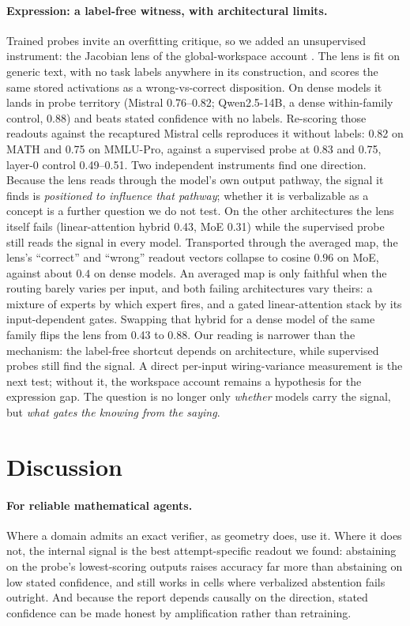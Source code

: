 \documentclass{article}
\begin{document}
\paragraph{Expression: a label-free witness, with architectural limits.}
Trained probes invite an overfitting critique, so we added an unsupervised instrument: the Jacobian lens of the global-workspace account \citep{gurnee2026workspace}.
The lens is fit on generic text, with no task labels anywhere in its construction, and scores the same stored activations as a wrong-vs-correct disposition.
On dense models it lands in probe territory (Mistral 0.76--0.82; Qwen2.5-14B, a dense within-family control, 0.88) and beats stated confidence with no labels.
Re-scoring those readouts against the recaptured Mistral cells reproduces it without labels: 0.82 on MATH and 0.75 on MMLU-Pro, against a supervised probe at 0.83 and 0.75, layer-0 control 0.49--0.51.
Two independent instruments find one direction.
Because the lens reads through the model's own output pathway, the signal it finds is \emph{positioned to influence that pathway}; whether it is verbalizable as a concept is a further question we do not test.
On the other architectures the lens itself fails (linear-attention hybrid 0.43, MoE 0.31) while the supervised probe still reads the signal in every model.
Transported through the averaged map, the lens's ``correct'' and ``wrong'' readout vectors collapse to cosine $0.96$ on MoE, against about $0.4$ on dense models.
An averaged map is only faithful when the routing barely varies per input, and both failing architectures vary theirs: a mixture of experts by which expert fires, and a gated linear-attention stack by its input-dependent gates.
Swapping that hybrid for a dense model of the same family flips the lens from 0.43 to 0.88.
Our reading is narrower than the mechanism: the label-free shortcut depends on architecture, while supervised probes still find the signal.
A direct per-input wiring-variance measurement is the next test; without it, the workspace account remains a hypothesis for the expression gap.
The question is no longer only \emph{whether} models carry the signal, but \emph{what gates the knowing from the saying}.

\section{Discussion}
\label{sec:discussion}

\paragraph{For reliable mathematical agents.}
Where a domain admits an exact verifier, as geometry does, use it.
Where it does not, the internal signal is the best attempt-specific readout we found: abstaining on the probe's lowest-scoring outputs raises accuracy far more than abstaining on low stated confidence, and still works in cells where verbalized abstention fails outright.
And because the report depends causally on the direction, stated confidence can be made honest by amplification rather than retraining.
\end{document}
